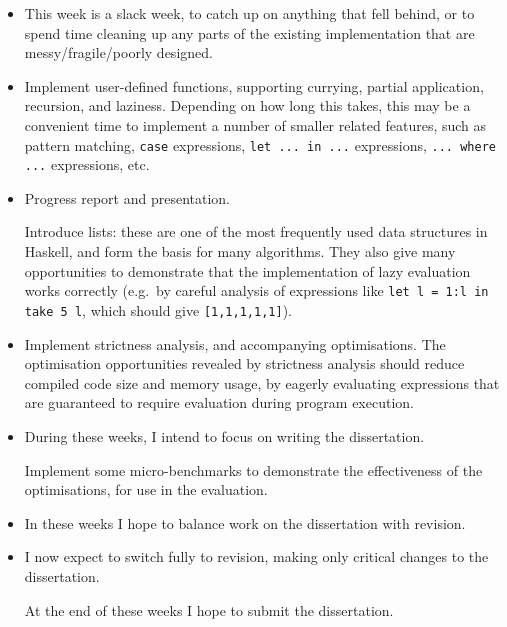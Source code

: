 \documentclass[12pt]{article}
\newcommand\haskell[1]{\texttt{#1}}
\begin{document}
\begin{itemize}
{    After this work is complete, the absolutely minimal success criteria should have been met, taking pressure off the
    rest of the planned work.
}
\item
{

    This week is a slack week, to catch up on anything that fell behind, or to spend time cleaning up any parts of the
    existing implementation that are messy/fragile/poorly designed.
}
\item
{

    Implement user-defined functions, supporting currying, partial application, recursion, and laziness. Depending on
    how long this takes, this may be a convenient time to implement a number of smaller related features, such as
    pattern matching, \haskell{case} expressions, \haskell{let ... in ...} expressions, \haskell{... where ...}
    expressions, etc.
}
\item
{

    Progress report and presentation.

    Introduce lists: these are one of the most frequently used data structures in Haskell, and form the basis for many
    algorithms. They also give many opportunities to demonstrate that the implementation of lazy evaluation works
    correctly (e.g.\ by careful analysis of expressions like \haskell{let l = 1:l in take 5 l}, which should give
    \haskell{[1,1,1,1,1]}).
}
\item
{

    Implement strictness analysis, and accompanying optimisations. The optimisation opportunities revealed by
    strictness analysis should reduce compiled code size and memory usage, by eagerly evaluating expressions that are
    guaranteed to require evaluation during program execution.
}
\item
{

    During these weeks, I intend to focus on writing the dissertation.

    Implement some micro-benchmarks to demonstrate the effectiveness of the optimisations, for use in the evaluation.
}
\item
{

    In these weeks I hope to balance work on the dissertation with revision.
}
\item
{

    I now expect to switch fully to revision, making only critical changes to the dissertation.

    At the end of these weeks I hope to submit the dissertation.
}
\end{itemize}
\end{document}
